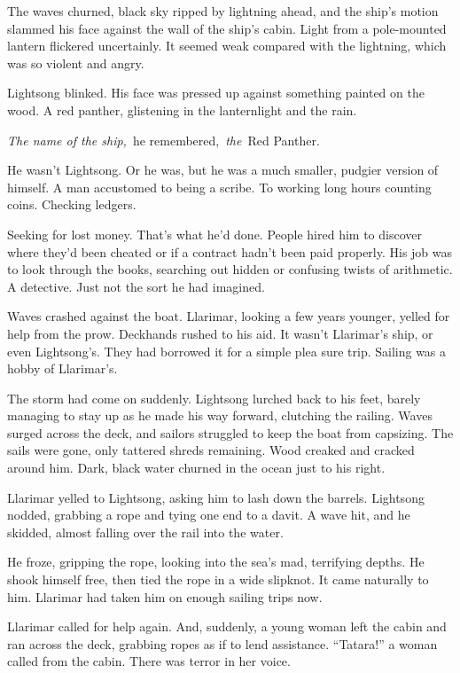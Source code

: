 The waves churned, black sky ripped by lightning ahead, and the ship’s motion slammed his face against the wall of the ship’s cabin. Light from a pole-mounted lantern flickered uncertainly. It seemed weak compared with the lightning, which was so violent and angry.

Lightsong blinked. His face was pressed up against something painted on the wood. A red panther, glistening in the lanternlight and the rain.

\textit{The name of the ship,}~he remembered,~\textit{the}~Red Panther.

He wasn’t Lightsong. Or he was, but he was a much smaller, pudgier version of himself. A man accustomed to being a scribe. To working long hours counting coins. Checking ledgers.

Seeking for lost money. That’s what he’d done. People hired him to discover where they’d been cheated or if a contract hadn’t been paid properly. His job was to look through the books, searching out hidden or confusing twists of arithmetic. A detective. Just not the sort he had imagined.

Waves crashed against the boat. Llarimar, looking a few years younger, yelled for help from the prow. Deckhands rushed to his aid. It wasn’t Llarimar’s ship, or even Lightsong’s. They had borrowed it for a simple plea sure trip. Sailing was a hobby of Llarimar’s.

The storm had come on suddenly. Lightsong lurched back to his feet, barely managing to stay up as he made his way forward, clutching the railing. Waves surged across the deck, and sailors struggled to keep the boat from capsizing. The sails were gone, only tattered shreds remaining. Wood creaked and cracked around him. Dark, black water churned in the ocean just to his right.

Llarimar yelled to Lightsong, asking him to lash down the barrels. Lightsong nodded, grabbing a rope and tying one end to a davit. A wave hit, and he skidded, almost falling over the rail into the water.

He froze, gripping the rope, looking into the sea’s mad, terrifying depths. He shook himself free, then tied the rope in a wide slipknot. It came naturally to him. Llarimar had taken him on enough sailing trips now.

Llarimar called for help again. And, suddenly, a young woman left the cabin and ran across the deck, grabbing ropes as if to lend assistance. “Tatara!” a woman called from the cabin. There was terror in her voice.

